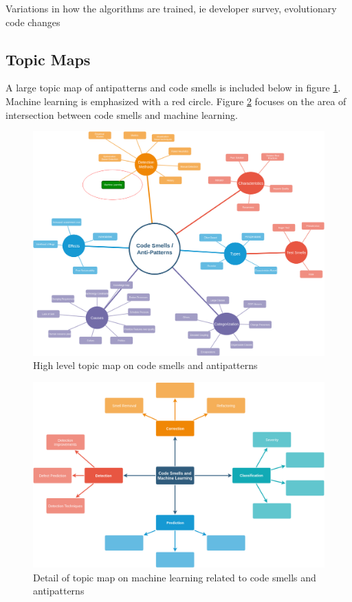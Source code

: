 \documentclass[conference]{IEEEtran}
\begin{document}
Variations in how the algorithms are trained, ie developer survey, evolutionary code changes
\subsection{Topic Maps}

A large topic map of antipatterns and code smells is included below in figure \ref{fig:TM}.
Machine learning is emphasized with a red circle. 
Figure \ref{fig:ML} focuses on the area of intersection between code smells and machine learning.
\begin{figure}[ht]
  \centerline{\includegraphics[width=\linewidth]{AntiPattern-TopicMap.png}}
  \caption{High level topic map on code smells and antipatterns}
  \label{fig:TM}
\end{figure} 

\begin{figure}[!ht]
  \centerline{\includegraphics[width=\textwidth]{ML-codesmells.png}}
  \caption{Detail of topic map on machine learning related to code smells and antipatterns}
  \label{fig:ML}
\end{figure} 
\end{document}
